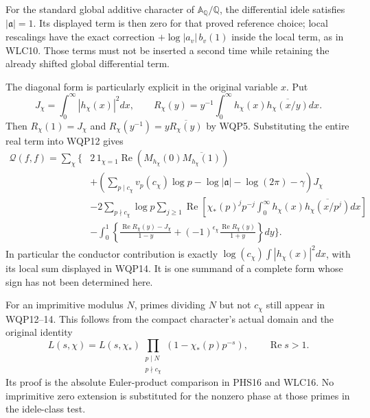 For the standard global additive character of
$\mathbb A_{\mathbb Q}/\mathbb Q$, the differential idele satisfies
$|\mathfrak a|=1$. Its displayed term is then zero for that
proved reference choice; local rescalings have the exact correction
$+\log|a_v|\,b_v(1)$ inside the local term, as in WLC10.
Those terms must not be inserted a second time while retaining
the already shifted global differential term.

The diagonal form is particularly explicit in the original variable
$x$. Put
\begin{equation}\tag{WQP13}
 J_\chi=\int_0^\infty|h_\chi(x)|^2dx,\qquad
 R_\chi(y)=y^{-1}\int_0^\infty
          h_\chi(x)\overline{h_\chi(x/y)}dx .
\end{equation}
Then $R_\chi(1)=J_\chi$ and
$R_\chi(y^{-1})=y\overline{R_\chi(y)}$ by WQP5.
Substituting the entire real term into WQP12 gives
\begin{equation}\tag{WQP14}
 \begin{split}
 \mathcal Q(f,f)=\sum_\chi\bigg\{&
  2\,1_{\chi=1}\operatorname{Re}
       \left(M_{h_\chi}(0)\overline{M_{h_\chi}(1)}\right)\\
 &+\left(\sum_{p\mid c_\chi}v_p(c_\chi)\log p
                -\log|\mathfrak a|-\log(2\pi)-\gamma\right)J_\chi\\
 &-2\sum_{p\nmid c_\chi}\log p\sum_{j\ge1}
       \operatorname{Re}\left[
         \chi_*(p)^j p^{-j}
           \int_0^\infty h_\chi(x)
                          \overline{h_\chi(x/p^j)}dx\right]\\
 &-\int_0^1
       \left\{\frac{\operatorname{Re}R_\chi(y)-J_\chi}{1-y}
          +(-1)^{\epsilon_\chi}
                 \frac{\operatorname{Re}R_\chi(y)}{1+y}\right\}dy
 \bigg\}.
 \end{split}
\end{equation}
In particular the conductor contribution is exactly
$\log(c_\chi)\int|h_\chi(x)|^2dx$, with its local sum displayed
in WQP14. It is one summand of a complete form whose sign has
not been determined here.

For an imprimitive modulus $N$, primes dividing $N$ but not
$c_\chi$ still appear in WQP12--14. This follows from the
compact character's actual domain and the original identity
\begin{equation}\tag{WQP15}
 L(s,\chi)=L(s,\chi_*)\!
     \prod_{\substack{p\mid N\\p\nmid c_\chi}}
                 (1-\chi_*(p)p^{-s}),\qquad\operatorname{Re}s>1.
\end{equation}
Its proof is the absolute Euler-product comparison in PHS16
and WLC16. No imprimitive zero extension is substituted for
the nonzero phase at those primes in the idele-class test.

